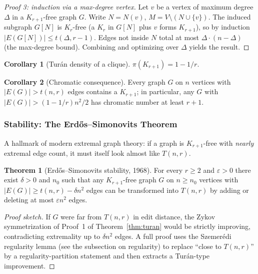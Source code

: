 \documentclass{article}
\theoremstyle{definition}
\newtheorem{theorem}{Theorem}
\newtheorem{corollary}{Corollary}
\begin{document}
\begin{proof}[Proof 3: induction via a max-degree vertex]
Let $v$ be a vertex of maximum degree $\Delta$ in a $K_{r+1}$-free
graph $G$. Write $N = N(v)$, $M = V \setminus (N \cup \{v\})$. The
induced subgraph $G[N]$ is $K_r$-free (a $K_r$ in $G[N]$ plus $v$
forms $K_{r+1}$), so by induction $|E(G[N])| \le t(\Delta, r - 1)$.
Edges not inside $N$ total at most $\Delta \cdot (n - \Delta)$ (the
max-degree bound). Combining and optimizing over $\Delta$ yields the
result.
\end{proof}

\begin{corollary}[Tur\'an density of a clique]
$\pi(K_{r+1}) = 1 - 1/r$.
\end{corollary}

\begin{corollary}[Chromatic consequence]
Every graph $G$ on $n$ vertices with $|E(G)| > t(n, r)$ edges
contains a $K_{r+1}$; in particular, any $G$ with $|E(G)| > (1 - 1/r) n^2/2$
has chromatic number at least $r + 1$.
\end{corollary}

\subsubsection{Stability: The Erd\H{o}s--Simonovits Theorem}

A hallmark of modern extremal graph theory: if a graph is $K_{r+1}$-free
with \emph{nearly} extremal edge count, it must itself look almost
like $T(n, r)$.

\begin{theorem}[Erd\H{o}s--Simonovits stability, 1968]\label{thm:stability}
For every $r \ge 2$ and $\varepsilon > 0$ there exist $\delta > 0$ and
$n_0$ such that any $K_{r+1}$-free graph $G$ on $n \ge n_0$ vertices
with $|E(G)| \ge t(n, r) - \delta n^2$ edges can be transformed into
$T(n, r)$ by adding or deleting at most $\varepsilon n^2$ edges.
\end{theorem}

\begin{proof}[Proof sketch]
If $G$ were far from $T(n, r)$ in edit distance, the Zykov
symmetrization of Proof~1 of Theorem~\ref{thm:turan} would be
strictly improving, contradicting extremality up to $\delta n^2$
edges. A full proof uses the Szemer\'edi regularity lemma (see the
subsection on regularity) to replace ``close to $T(n, r)$'' by a
regularity-partition statement and then extracts a Tur\'an-type
improvement.
\end{proof}
\end{document}
